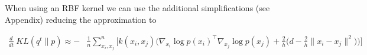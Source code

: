 \documentclass{article}
\begin{document}
    When using an RBF kernel we can use the additional simplifications (see Appendix) reducing the approximation to

    \begin{align}
        \frac{d}{dt}\ KL( q^t \| p ) \approx -& \frac{1}{n}\sum_{x_i,x_j}^n  \Bigg[
            k(x_i,x_j) \Bigg( \nabla_{x_i} \log p(x_i)^\top \nabla_{x_j} \log p(x_j)  
            + \frac{2}{h}\Big( d - \frac{2}{h} \|x_i - x_j\|^2 \Big) \Bigg)
        \Bigg]
    \end{align} 


\end{document}
